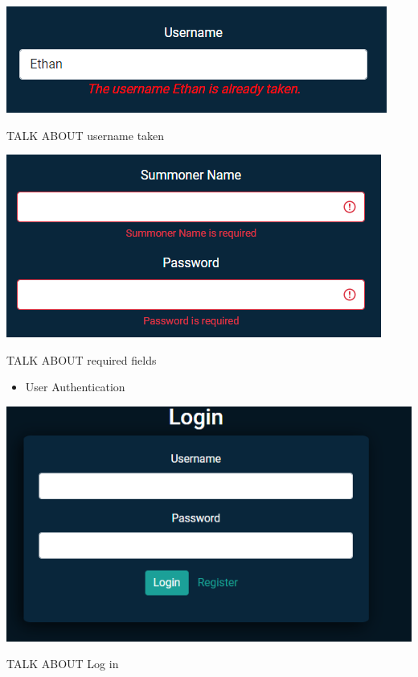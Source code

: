 \begin{center}    
	\includegraphics[width=\textwidth/2,height=\textheight,keepaspectratio]{img/UsernameTaken.png}
\end{center}
TALK ABOUT username taken

\begin{center}    
	\includegraphics[width=\textwidth/2,height=\textheight,keepaspectratio]{img/RequiredFields.png}
\end{center}
TALK ABOUT required fields

\newpage
\begin{itemize}
	\item User Authentication
\end{itemize}
\begin{center}    
	\includegraphics[width=\textwidth/2,height=\textheight,keepaspectratio]{img/Login.png}
\end{center}
TALK ABOUT Log in

